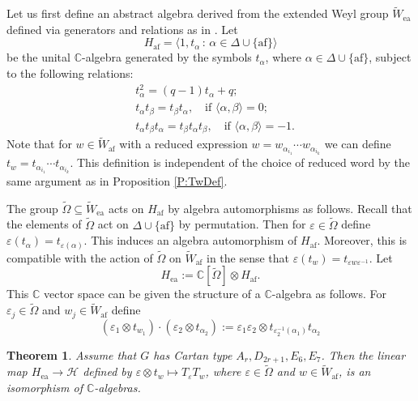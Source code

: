 \documentclass[10pt, letterpaper]{amsart}
\theoremstyle{plain}
\newtheorem{Thm}[equation]{Theorem}
\theoremstyle{definition}
\numberwithin{equation}{section}
\newcommand{\Wt}{\widetilde{W}}
\newcommand{\Omegat}{\widetilde{\Omega}}
\newcommand{\af}{\mathrm{af}}
\newcommand{\ea}{\mathrm{ea}}
\newcommand{\Hcal}{\mathcal{H}}
\newcommand{\la}{\langle}
\newcommand{\ra}{\rangle}
\newcommand{\st}{\,:\,}
\begin{document}
        Let us first define an abstract algebra derived from the extended Weyl group $\Wt_{\ea}$ defined via generators and relations as in \cite[Section 3.1]{IM}. Let 
        \[
        H_{\af}=\la 1, t_{\alpha}\st \alpha\in\Delta\cup\{\af\}\ra
        \]
        be the unital $\mathbb{C}$-algebra generated by the symbols $t_{\alpha}$, where $\alpha\in\Delta\cup\{\af\}$, subject to the following relations:
        \begin{align*}
            &t_{\alpha}^{2}=(q-1)t_{\alpha}+q;\\
            &t_{\alpha}t_{\beta}=t_{\beta}t_{\alpha},\quad \text{if } \langle\alpha,\beta\rangle=0;\\
            &t_{\alpha}t_{\beta}t_{\alpha}=t_{\beta}t_{\alpha}t_{\beta},\quad \text{if } \langle\alpha,\beta\rangle=-1.
        \end{align*}
        Note that for $w\in \Wt_{\af}$ with a reduced expression $w=w_{\alpha_{i_{1}}}\cdots w_{\alpha_{i_{k}}}$ we can define $t_{w}=t_{\alpha_{i_{1}}}\cdots t_{\alpha_{i_{k}}}$. This definition is independent of the choice of reduced word by the same argument as in Proposition \ref{P:TwDef}.
        
        The group $\Omegat\subseteq \Wt_{\ea}$ acts on $H_{\af}$ by algebra automorphisms as follows. Recall that the elements of $\Omegat$ act on $\Delta\cup\{\af\}$ by permutation. Then for $\varepsilon\in\Omegat$ define $\varepsilon(t_{\alpha})=t_{\varepsilon(\alpha)}$. This induces an algebra automorphism of $H_{\af}$. Moreover, this is compatible with the action of $\Omegat$ on $\Wt_{\af}$ in the sense that $\varepsilon(t_{w})=t_{\varepsilon w\varepsilon^{-1}}$. Let 
        \[
        H_{\ea}:=\mathbb{C}[\Omegat]\otimes H_{\af}.
        \]
        This $\mathbb{C}$ vector space can be given the structure of a $\mathbb{C}$-algebra as follows. For $\varepsilon_{j}\in \Omegat$ and $w_{j}\in \Wt_{\af}$ define
        \begin{equation*}
            (\varepsilon_{1}\otimes t_{w_{1}})\cdot (\varepsilon_{2}\otimes t_{\alpha_{2}}):=\varepsilon_{1}\varepsilon_{2}\otimes t_{\varepsilon_{2}^{-1}(\alpha_{1})}t_{\alpha_{2}}
        \end{equation*}

        
        
        \begin{Thm}\label{IMPres} Assume that $G$ has Cartan type $A_r, D_{2r+1}, E_{6},E_{7}$. Then the linear map $H_{\ea}\rightarrow \Hcal$ defined by $\varepsilon\otimes t_{w}\mapsto T_{\varepsilon}T_{w}$, where $\varepsilon\in\Omegat$ and $w\in \Wt_{\af}$, is an isomorphism of $\mathbb{C}$-algebras.
        \end{Thm}
\end{document}
